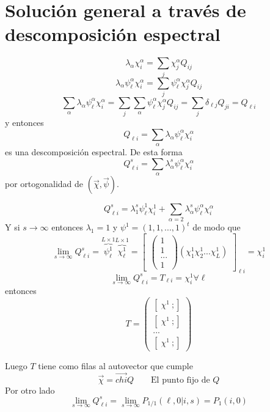 \documentclass[10pt,oneside]{CBFT_book}
\begin{document}
\section{Solución general a través de descomposición espectral}

\[
	\lambda_\alpha \chi_i^\alpha = \sum_j \chi_j^\alpha Q_{ij} 
\]
\[
	\lambda_\alpha \psi_\ell^\alpha \chi_i^\alpha = \sum_j \psi_\ell^\alpha\chi_j^\alpha Q_{ij} 
\]
\[
	\sum_\alpha \lambda_\alpha \psi_\ell^\alpha \chi_i^\alpha = 
	\sum_j \sum_\alpha \psi_\ell^\alpha\chi_j^\alpha Q_{ij} =
	\sum_j \delta_{\ell j} Q_{ji} = Q_{\ell i}
\]
y entonces 
\[
	Q_{\ell i} = \sum_\alpha \lambda_\alpha \psi_\ell^\alpha \chi_i^\alpha
\]
es una descomposición espectral.
De esta forma 
\[
	Q_{\ell i}^s = \sum_\alpha \lambda_\alpha^s \psi_\ell^\alpha \chi_i^\alpha
\]
por ortogonalidad de $( \vec{\chi}, \vec{\psi} )$.

\[
	Q_{\ell i}^s = \lambda_1^s \psi_\ell^1 \chi_i^1 + 
	\sum_{\alpha=2} \lambda_\alpha^s \psi_\ell^\alpha \chi_i^\alpha
\]
Y si $s \to \infty$ entonces $\lambda_1 = 1$ y $\psi^1 = (1,1,...,1)^t$ de modo que 
\[
	\lim_{s\to \infty} Q^s_{\ell i} = \overbrace{\psi_\ell^1}^{L\times 1} 
	\overbrace{\chi_\ell^1}^{L\times 1} = \begin{bmatrix}
	                                       \begin{pmatrix}
	                                        1 \\
	                                        1 \\ 
	                                        ... \\
	                                        1
	                                       \end{pmatrix}
						(\chi_1^1 \chi_2^1 ... \chi_L^1 )
	                                      \end{bmatrix}_{\ell i}
	= \chi_i^1
\]
\[
	\lim_{s\to \infty} Q^s_{\ell i} = T_{\ell i} = \chi_i^1 \forall \ell
\]
entonces
\[
	T = \begin{pmatrix}
	     [ \; \chi^1 \ ; ] \\
	     [ \; \chi^1 \ ; ] \\
	     ...\\
	     [ \; \chi^1 \ ; ]
	    \end{pmatrix}
\]

Luego $T$ tiene como filas al autovector que cumple
\[
	\vec{\chi} = \vec{chi} Q \qquad \text{El punto fijo de $Q$}
\]
Por otro lado
\[
	\lim_{s\to \infty} Q^s_{\ell i} = \lim_{s\to \infty} P_{1/1}(\ell, 0 | i,s) = P_1(i,0)
\]
\end{document}

